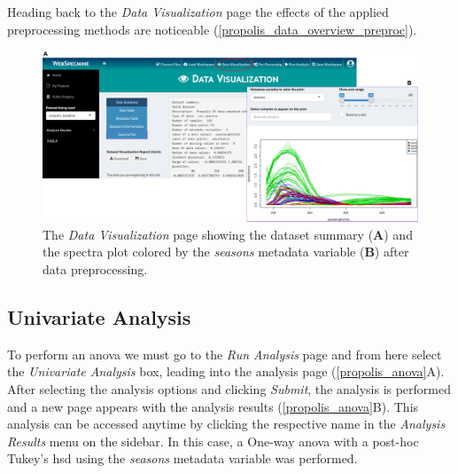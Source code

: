 Heading back to the \textit{Data Visualization} page the effects of the applied preprocessing methods are noticeable (\autoref{propolis_data_overview_preproc}).


\begin{figure}[H]
	\centering
	\includegraphics[width=1\linewidth]{Imagens/Propolis/data_overview_preproc}
	\caption{The \textit{Data Visualization} page showing the dataset summary (\textbf{A}) and the spectra plot colored by the \textit{seasons} metadata variable (\textbf{B}) after data preprocessing.}
	\label{propolis_data_overview_preproc}
\end{figure}



\subsection{Univariate Analysis}

To perform an \gls{anova} we must go to the \textit{Run Analysis} page and from here select the \textit{Univariate Analysis} box, leading into the analysis page (\autoref{propolis_anova}A). After selecting the analysis options and clicking \textit{Submit}, the analysis is performed and a new page appears with the analysis results (\autoref{propolis_anova}B). This analysis can be accessed anytime by clicking the respective name in the \textit{Analysis Results} menu on the sidebar. In this case, a One-way \gls{anova} with a post-hoc Tukey's \gls{hsd} using the \textit{seasons} metadata variable was performed.

